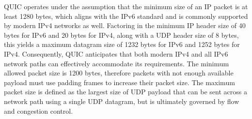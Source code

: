 QUIC operates under the assumption that the minimum size of an IP packet is at least 1280 bytes, which aligns with the IPv6 standard and is commonly supported by modern IPv4 networks as well. Factoring in the minimum IP header size of 40 bytes for IPv6 and 20 bytes for IPv4, along with a UDP header size of 8 bytes, this yields a maximum datagram size of 1232 bytes for IPv6 and 1252 bytes for IPv4. Consequently, QUIC anticipates that both modern IPv4 and all IPv6 network paths can effectively accommodate its requirements. The minimum allowed packet size is 1200 bytes, therefore packets with not enough available payload must use padding frames to increase their packet size. The maximum packet size is defined as the largest size of UDP payload that can be sent across a network path using a single UDP datagram, but is ultimately governed by flow and congestion control.

